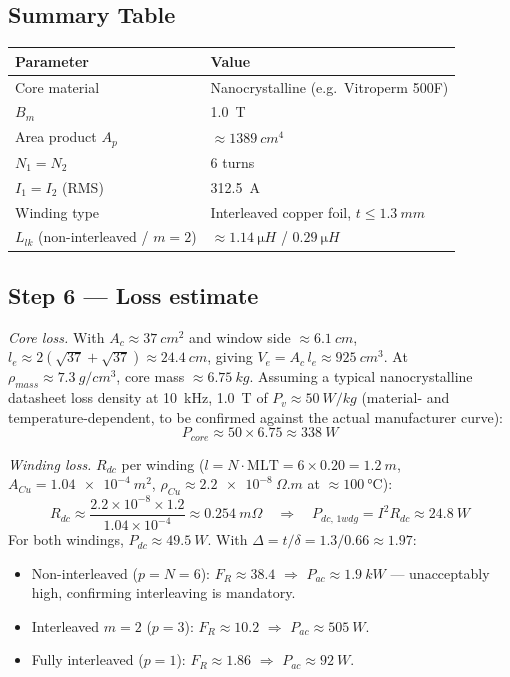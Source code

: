 \documentclass[11pt,a4paper]{article}
\begin{document}
\subsection*{Summary Table}
\begin{center}
\begin{tabular}{@{}ll@{}}
\toprule
Parameter & Value \\
\midrule
Core material & Nanocrystalline (e.g.\ Vitroperm 500F) \\
$B_m$ & \SI{1.0}{T} \\
Area product $A_p$ & $\approx \SI{1389}{cm^4}$ \\
$N_1 = N_2$ & 6 turns \\
$I_1 = I_2$ (RMS) & \SI{312.5}{A} \\
Winding type & Interleaved copper foil, $t \le \SI{1.3}{mm}$ \\
$L_{lk}$ (non-interleaved / $m{=}2$) & $\approx\SI{1.14}{\micro H}$ / $\SI{0.29}{\micro H}$ \\
\bottomrule
\end{tabular}
\end{center}

\subsection*{Step 6 — Loss estimate}
\textit{Core loss.} With $A_c\approx\SI{37}{cm^2}$ and window side
$\approx\SI{6.1}{cm}$, $l_e\approx2(\sqrt{37}+\sqrt{37})\approx\SI{24.4}{cm}$, giving
$V_e = A_c\,l_e \approx \SI{925}{cm^3}$. At $\rho_{mass}\approx\SI{7.3}{g/cm^3}$,
core mass $\approx\SI{6.75}{kg}$. Assuming a typical nanocrystalline datasheet
loss density at \SI{10}{kHz}, \SI{1.0}{T} of $P_v\approx\SI{50}{W/kg}$
(material- and temperature-dependent, to be confirmed against the actual
manufacturer curve):
\begin{equation}
    P_{core} \approx 50 \times 6.75 \approx \SI{338}{W}
\end{equation}

\textit{Winding loss.} $R_{dc}$ per winding ($l=N\cdot\mathrm{MLT}=6\times0.20=\SI{1.2}{m}$,
$A_{Cu}=\SI{1.04e-4}{m^2}$, $\rho_{Cu}\approx\SI{2.2e-8}{\Omega.m}$ at $\approx\SI{100}{\celsius}$):
\begin{equation}
    R_{dc} \approx \frac{2.2\times10^{-8}\times1.2}{1.04\times10^{-4}} \approx \SI{0.254}{m\Omega}
    \quad\Rightarrow\quad P_{dc,\,1wdg} = I^2 R_{dc} \approx \SI{24.8}{W}
\end{equation}
For both windings, $P_{dc}\approx\SI{49.5}{W}$. With $\Delta=t/\delta=1.3/0.66\approx1.97$:
\begin{itemize}
    \item Non-interleaved ($p=N=6$): $F_R\approx 38.4$ $\Rightarrow$ $P_{ac}\approx\SI{1.9}{kW}$ — unacceptably high, confirming interleaving is mandatory.
    \item Interleaved $m=2$ ($p=3$): $F_R\approx 10.2$ $\Rightarrow$ $P_{ac}\approx\SI{505}{W}$.
    \item Fully interleaved ($p=1$): $F_R\approx 1.86$ $\Rightarrow$ $P_{ac}\approx\SI{92}{W}$.
\end{itemize}
\end{document}
